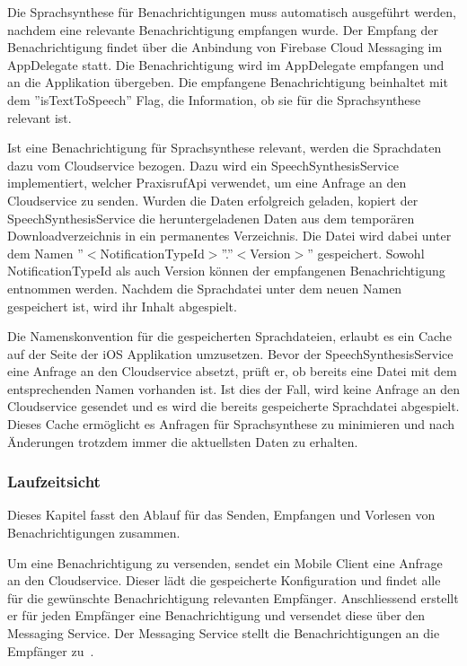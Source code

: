 Die Sprachsynthese für Benachrichtigungen muss automatisch ausgeführt werden, nachdem eine relevante Benachrichtigung empfangen wurde.
Der Empfang der Benachrichtigung findet über die Anbindung von Firebase Cloud Messaging im AppDelegate statt.
Die Benachrichtigung wird im AppDelegate empfangen und an die Applikation übergeben.
Die empfangene Benachrichtigung beinhaltet mit dem ''isTextToSpeech'' Flag, die Information, ob sie für die Sprachsynthese relevant ist.

Ist eine Benachrichtigung für Sprachsynthese relevant, werden die Sprachdaten dazu vom Cloudservice bezogen.
Dazu wird ein SpeechSynthesisService implementiert, welcher PraxisrufApi verwendet, um eine Anfrage an den Cloudservice zu senden.
Wurden die Daten erfolgreich geladen, kopiert der SpeechSynthesisService die heruntergeladenen Daten aus dem temporären Downloadverzeichnis in ein permanentes Verzeichnis.
Die Datei wird dabei unter dem Namen ''$<$NotificationTypeId$>$''.''$<$Version$>$'' gespeichert.
Sowohl NotificationTypeId als auch Version können der empfangenen Benachrichtigung entnommen werden.
Nachdem die Sprachdatei unter dem neuen Namen gespeichert ist, wird ihr Inhalt abgespielt.

Die Namenskonvention für die gespeicherten Sprachdateien, erlaubt es ein Cache auf der Seite der iOS Applikation umzusetzen.
Bevor der SpeechSynthesisService eine Anfrage an den Cloudservice absetzt, prüft er, ob bereits eine Datei mit dem entsprechenden Namen vorhanden ist.
Ist dies der Fall, wird keine Anfrage an den Cloudservice gesendet und es wird die bereits gespeicherte Sprachdatei abgespielt.
Dieses Cache ermöglicht es Anfragen für Sprachsynthese zu minimieren und nach Änderungen trotzdem immer die aktuellsten Daten zu erhalten.

\subsubsection{Laufzeitsicht}

Dieses Kapitel fasst den Ablauf für das Senden, Empfangen und Vorlesen von Benachrichtigungen zusammen.

Um eine Benachrichtigung zu versenden, sendet ein Mobile Client eine Anfrage an den Cloudservice.
Dieser lädt die gespeicherte Konfiguration und findet alle für die gewünschte Benachrichtigung relevanten Empfänger.
Anschliessend erstellt er für jeden Empfänger eine Benachrichtigung und versendet diese über den Messaging Service.
Der Messaging Service stellt die Benachrichtigungen an die Empfänger zu~\cite{ip5}.

